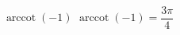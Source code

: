  {$\operatorname{arccot} \left( -1 \right)$ }
{ $\operatorname{arccot} \left( -1 \right) = \dfrac{3\pi}{4}$}
